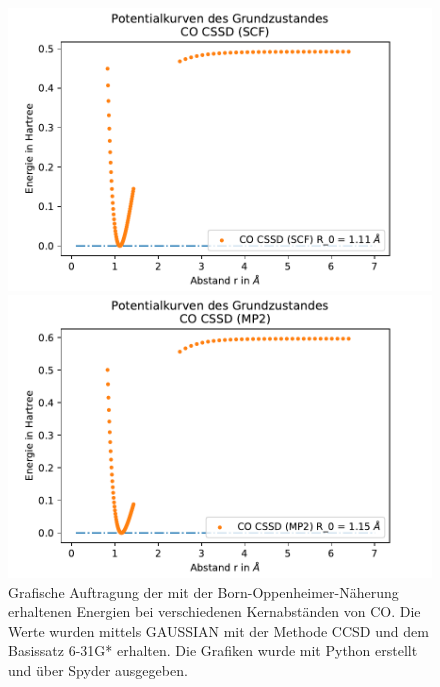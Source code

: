 \begin{figure}[H]
	\center
	\begin{minipage}{0.8\textwidth}
	\includegraphics[width=\textwidth]{Bilder/CO_CSSD(SCF).pdf}
	
	\end{minipage}
\begin{minipage}{0.8\textwidth}
	\includegraphics[width=\textwidth]{Bilder/CO_CSSD(MP2).pdf}
	
	\end{minipage}	
	\caption{Grafische Auftragung der mit der Born-Oppenheimer-Näherung erhaltenen Energien bei verschiedenen Kernabständen von CO. Die Werte wurden mittels GAUSSIAN mit der Methode CCSD und dem Basissatz 6-31G* erhalten. Die Grafiken wurde mit Python erstellt und über Spyder ausgegeben.}	
\end{figure}





